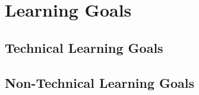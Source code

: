 \chapter{Learning Goals}
\label{chap:learning_goals}

\section{Technical Learning Goals}

\section{Non-Technical Learning Goals}
